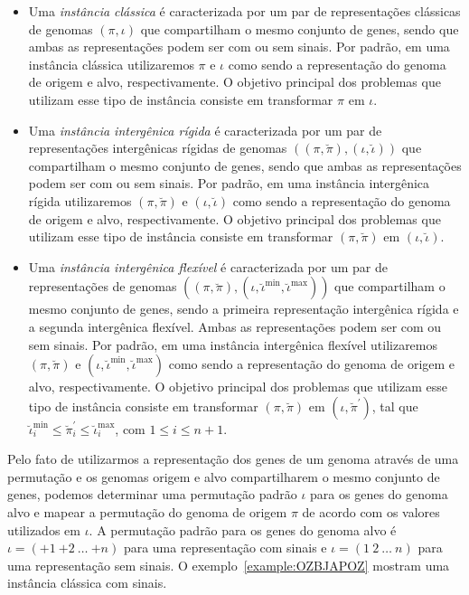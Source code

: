 \begin{itemize}
\item Uma \emph{instância clássica} é caracterizada por um par de representações clássicas de genomas $(\pi,\iota)$ que compartilham o mesmo conjunto de genes, sendo que ambas as representações podem ser com ou sem sinais. Por padrão, em uma instância clássica utilizaremos $\pi$ e $\iota$ como sendo a representação do genoma de origem e alvo, respectivamente. O objetivo principal dos problemas que utilizam esse tipo de instância consiste em transformar $\pi$ em $\iota$.
\item Uma \emph{instância intergênica rígida} é caracterizada por um par de representações intergênicas rígidas de genomas $((\pi,\breve\pi),(\iota,\breve\iota))$ que compartilham o mesmo conjunto de genes, sendo que ambas as representações podem ser com ou sem sinais. Por padrão, em uma instância intergênica rígida utilizaremos $(\pi,\breve\pi)$ e $(\iota,\breve\iota)$ como sendo a representação do genoma de origem e alvo, respectivamente. O objetivo principal dos problemas que utilizam esse tipo de instância consiste em transformar $(\pi,\breve\pi)$ em $(\iota,\breve\iota)$.
\item Uma \emph{instância intergênica flexível} é caracterizada por um par de representações de genomas $((\pi,\breve\pi),(\iota,\breve\iota^{\min},\breve\iota^{\max}))$ que compartilham o mesmo conjunto de genes, sendo a primeira representação intergênica rígida e a segunda intergênica flexível. Ambas as representações podem ser com ou sem sinais. Por padrão, em uma instância intergênica flexível utilizaremos $(\pi,\breve\pi)$ e $(\iota,\breve\iota^{\min},\breve\iota^{\max})$ como sendo a representação do genoma de origem e alvo, respectivamente. O objetivo principal dos problemas que utilizam esse tipo de instância consiste em transformar $(\pi,\breve\pi)$ em $(\iota,\breve\pi^{\prime})$, tal que $\breve\iota^{\min}_i \le \breve\pi^{\prime}_i \le \breve\iota^{\max}_i$, com $1 \le i \le n+1$.
\end{itemize}

Pelo fato de utilizarmos a representação dos genes de um genoma através de uma permutação e os genomas origem e alvo compartilharem o mesmo conjunto de genes, podemos determinar uma permutação padrão $\iota$ para os genes do genoma alvo e mapear a permutação do genoma de origem $\pi$ de acordo com os valores utilizados em $\iota$. A permutação padrão para os genes do genoma alvo é $\iota=({+1}~{+2}~\dots~{+n})$ para uma representação com sinais e $\iota=(1~2~\dots~n)$ para uma representação sem sinais. O exemplo~\ref{example:OZBJAPOZ} mostram uma instância clássica com sinais.


